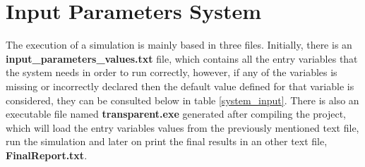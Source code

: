 \section{Input Parameters System}
\label{ips}

The execution of a simulation is mainly based in three files. Initially, there is an \textbf{input\_parameters\_values.txt} file, which contains all the entry variables that the system needs in order to run correctly, however, if any of the variables is missing or incorrectly declared then the default value defined for that variable is considered, they can be consulted below in table \ref{system_input}. There is also an executable file named \textbf{transparent.exe} generated after compiling the project, which  will load the entry variables values from the previously mentioned text file, run the simulation and later on print the final results in an other text file, \textbf{FinalReport.txt}.\\ \\

